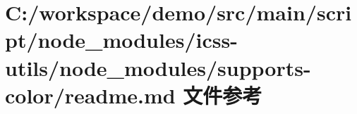 \hypertarget{node__modules_2icss-utils_2node__modules_2supports-color_2_r_e_a_d_m_e_8md}{}\section{C\+:/workspace/demo/src/main/script/node\+\_\+modules/icss-\/utils/node\+\_\+modules/supports-\/color/readme.md 文件参考}
\label{node__modules_2icss-utils_2node__modules_2supports-color_2_r_e_a_d_m_e_8md}

